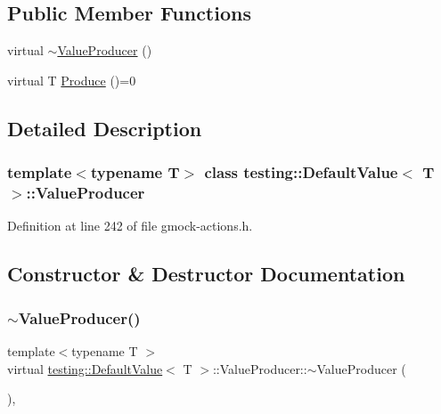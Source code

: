 \subsection*{Public Member Functions}
\begin{DoxyCompactItemize}
\item 
virtual \hyperlink{classtesting_1_1DefaultValue_1_1ValueProducer_aa78c53c5676f4df0efc5c319f8715963}{$\sim$\+Value\+Producer} ()
\item 
virtual T \hyperlink{classtesting_1_1DefaultValue_1_1ValueProducer_adb9e38abe068ac2e792b53fd32bd7e96}{Produce} ()=0
\end{DoxyCompactItemize}


\subsection{Detailed Description}
\subsubsection*{template$<$typename T$>$\newline
class testing\+::\+Default\+Value$<$ T $>$\+::\+Value\+Producer}



Definition at line 242 of file gmock-\/actions.\+h.



\subsection{Constructor \& Destructor Documentation}
\mbox{\label{classtesting_1_1DefaultValue_1_1ValueProducer_aa78c53c5676f4df0efc5c319f8715963}} 
\subsubsection{\texorpdfstring{$\sim$\+Value\+Producer()}{~ValueProducer()}}
{\footnotesize\ttfamily template$<$typename T $>$ \\
virtual \hyperlink{classtesting_1_1DefaultValue}{testing\+::\+Default\+Value}$<$ T $>$\+::Value\+Producer\+::$\sim$\+Value\+Producer (\begin{DoxyParamCaption}{ }\end{DoxyParamCaption})\hspace{0.3cm}{\ttfamily [inline]}, {\ttfamily [virtual]}}



